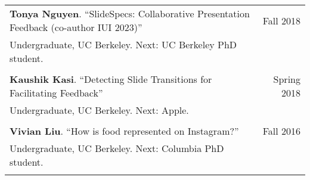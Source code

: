 \begin{longtable}{Xr}
	\textbf{Tonya Nguyen}. ``SlideSpecs: Collaborative Presentation Feedback (co-author IUI 2023)'' & Fall 2018 \\
	Undergraduate, UC Berkeley. Next: UC Berkeley PhD student. &  \\
	\\

	\textbf{Kaushik Kasi}. ``Detecting Slide Transitions for Facilitating Feedback'' & Spring 2018 \\
	Undergraduate, UC Berkeley. Next: Apple. &  \\
	\\

	\textbf{Vivian Liu}. ``How is food represented on Instagram?'' & Fall 2016 \\
	Undergraduate, UC Berkeley. Next: Columbia PhD student. &  \\
	\\

\end{longtable}